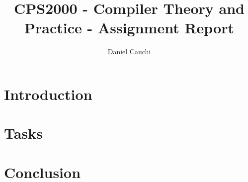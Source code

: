 \documentclass{report}
\begin{document}
\title{CPS2000  - Compiler Theory and Practice - Assignment Report}
\author{Daniel Cauchi}
\date{}
\maketitle

\tableofcontents

\chapter{Introduction}

\chapter{Tasks}

\pagebreak

\pagebreak

\pagebreak

\pagebreak

\pagebreak

\chapter{Conclusion}


\pagebreak



\end{document}
